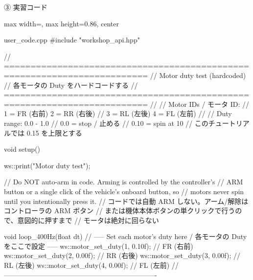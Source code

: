 \begin{frame}[fragile]{③ 実習コード}
  \begin{adjustbox}{max width=\textwidth, max height=0.86\textheight, center}
  \begin{sflisting}[basicstyle=\ttfamily\tiny, aboveskip=1pt, belowskip=0pt]{user\_code.cpp}
#include "workshop_api.hpp"

// =========================================================================
// Motor duty test (hardcoded)
// 各モータの Duty をハードコードする
// =========================================================================
//
// Motor IDs / モータ ID:
//   1 = FR (右前)   2 = RR (右後)
//   3 = RL (左後)   4 = FL (左前)
//
// Duty range: 0.0 - 1.0
//   0.0  = stop / 止める
//   0.10 = spin at 10%
//   このチュートリアルでは 0.15 を上限とする

void setup()
{
    ws::print("Motor duty test");

    // Do NOT auto-arm in code. Arming is controlled by the controller's
    // ARM button or a single click of the vehicle's onboard button, so
    // motors never spin until you intentionally press it.
    // コードでは自動 ARM しない。アーム/解除はコントローラの ARM ボタン
    // または機体本体ボタンの単クリックで行うので、意図的に押すまで
    // モータは絶対に回らない
}

void loop_400Hz(float dt)
{
    // ----- Set each motor's duty here / 各モータの Duty をここで設定 -----
    ws::motor_set_duty(1, 0.10f);   // FR (右前)
    ws::motor_set_duty(2, 0.00f);   // RR (右後)
    ws::motor_set_duty(3, 0.00f);   // RL (左後)
    ws::motor_set_duty(4, 0.00f);   // FL (左前)
    // -------------------------------------------------------------------
}
  \end{sflisting}
  \end{adjustbox}
\end{frame}

